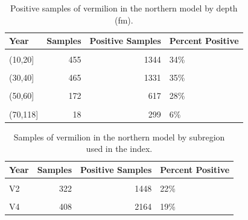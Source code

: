 \documentclass[11pt,
  english,
  a4paper,
]{article}
\begin{document}
\begin{table}

\caption{\label{tab:tab-depth-debwv}Positive samples of vermilion in the northern model by depth (fm).}
\centering
\begin{tabular}[t]{lrrl}
\toprule
Year & Samples & Positive Samples & Percent Positive\\
\midrule
\cellcolor{gray!6}{(0,10]} & \cellcolor{gray!6}{113} & \cellcolor{gray!6}{478} & \cellcolor{gray!6}{24\%}\\
(10,20] & 455 & 1344 & 34\%\\
\cellcolor{gray!6}{(20,30]} & \cellcolor{gray!6}{410} & \cellcolor{gray!6}{1198} & \cellcolor{gray!6}{34\%}\\
(30,40] & 465 & 1331 & 35\%\\
\cellcolor{gray!6}{(40,50]} & \cellcolor{gray!6}{347} & \cellcolor{gray!6}{1067} & \cellcolor{gray!6}{33\%}\\
\addlinespace
(50,60] & 172 & 617 & 28\%\\
\cellcolor{gray!6}{(60,70]} & \cellcolor{gray!6}{36} & \cellcolor{gray!6}{263} & \cellcolor{gray!6}{14\%}\\
(70,118] & 18 & 299 & 6\%\\
\bottomrule
\end{tabular}
\end{table}

\begin{table}

\caption{\label{tab:tab-region-debwv}Samples of vermilion in the northern model by subregion used in the index.}
\centering
\begin{tabular}[t]{lrrl}
\toprule
Year & Samples & Positive Samples & Percent Positive\\
\midrule
\cellcolor{gray!6}{V1} & \cellcolor{gray!6}{362} & \cellcolor{gray!6}{1317} & \cellcolor{gray!6}{27\%}\\
V2 & 322 & 1448 & 22\%\\
\cellcolor{gray!6}{V3} & \cellcolor{gray!6}{924} & \cellcolor{gray!6}{1668} & \cellcolor{gray!6}{55\%}\\
V4 & 408 & 2164 & 19\%\\
\bottomrule
\end{tabular}
\end{table}
\end{document}
